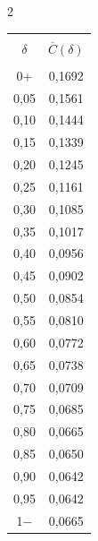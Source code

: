 \begin{multicols}{2}
{\begin{center}
\tabcolsep=16pt


\begin{tabular}{|c|c|}


\hline &\\[-9pt]


 $\delta$ & $\overline{C}(\delta)$ \\[2pt]


\hline


&\\[-8pt]


 0+    &  0,1692  \\


 0,05  &  0,1561  \\


 0,10  &  0,1444  \\


 0,15  &  0,1339  \\


 0,20  &  0,1245  \\


 0,25  &  0,1161  \\


 0,30  &  0,1085  \\


 0,35  &  0,1017  \\


 0,40  &  0,0956  \\


 0,45  &  0,0902  \\


 0,50  &  0,0854  \\


 0,55  &  0,0810  \\


 0,60  &  0,0772  \\


 0,65  &  0,0738  \\


 0,70  &  0,0709  \\


 0,75  &  0,0685  \\


 0,80  &  0,0665  \\


 0,85  &  0,0650  \\


 0,90  &  0,0642  \\


 0,95  &  0,0642  \\


 1$-$  &  0,0665  \\



\end{tabular}
\end{center}}
\end{multicols}
